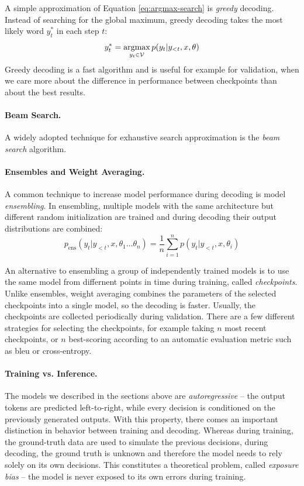 A simple approximation of Equation \ref{eq:argmax-search} is \emph{greedy}
decoding. Instead of searching for the global maximum, greedy decoding takes
the most likely word $y_t^*$ in each step $t$:
%
\begin{equation}
  y_t^* = \operatorname*{argmax}_{y_t \in \mathcal{V}} p(y_t | y_{<t}, x, \theta)
  \label{eq:greedy-decoding}
\end{equation}
%
Greedy decoding is a fast algorithm and is useful for example for validation,
when we care more about the difference in performance between checkpoints than
about the best results.

\paragraph{Beam Search.}
A widely adopted technique for exhaustive search approximation is the
\emph{beam search} algorithm. 

\paragraph{Ensembles and Weight Averaging.} A common technique to increase
model performance during decoding is model \emph{ensembling}. In ensembling,
multiple models with the same architecture but different random initialization
are trained and during decoding their output distributions are combined:
%
\begin{equation}
  p_{\text{ens}}(y_t | y_{<t}, x, \theta_1 \ldots \theta_n) =
  \frac{1}{n} \sum_{i=1}^n p(y_t | y_{<t}, x, \theta_i)
\end{equation}

An alternative to ensembling a group of independently trained models is to use
the same model from differnent points in time during training, called
\emph{checkpoints}. Unlike ensembles, weight averaging combines the parameters
of the selected checkpoints into a single model, so the decoding is faster.
Usually, the checkpoints are collected periodically during validation. There
are a few different strategies for selecting the checkpoints, for example
taking $n$ most recent checkpoints, or $n$ best-scoring according to an
automatic evaluation metric such as \acs{bleu} or cross-entropy.

\paragraph{Training vs. Inference.}
The models we described in the sections above are \emph{autoregressive} -- the
output tokens are predicted left-to-right, while every decision is conditioned
on the previously generated outputs. With this property, there comes an
important distinction in behavior between training and decoding. Whereas during
training, the ground-truth data are used to simulate the previous decisions,
during decoding, the ground truth is unknown and therefore the model needs to
rely solely on its own decisions. This constitutes a theoretical problem,
called \emph{exposure bias} -- the model is never exposed to its own errors
during training.

